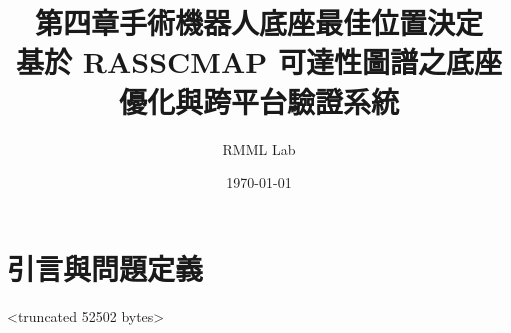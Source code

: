 \documentclass[a4paper, 12pt]{ctexart}
\title{%
    \textbf{第四章\quad 手術機器人底座最佳位置決定} \\[8pt]
    \large 基於 RASSCMAP 可達性圖譜之底座優化與跨平台驗證系統
}
\author{RMML Lab}
\date{\today}
\begin{document}
\maketitle
\tableofcontents
\newpage

\section{引言與問題定義}
\label{sec:introduction}
<truncated 52502 bytes>
\end{document}

